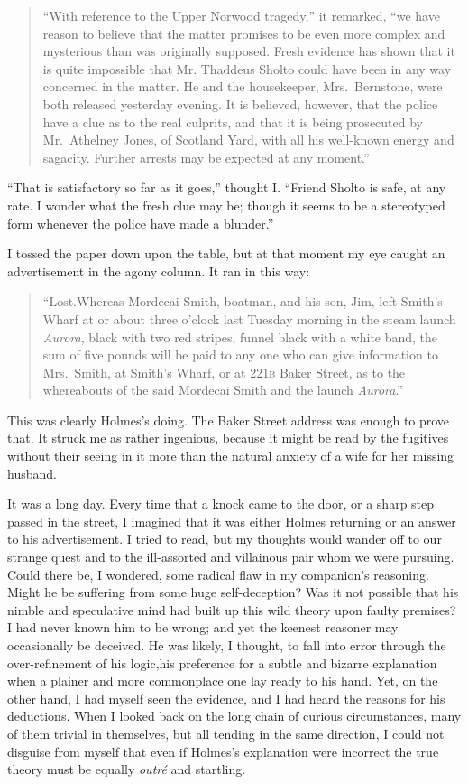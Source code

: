 \documentclass[12pt,english,oneside]{book}
\newcommand{\noun}[1]{\textsc{#1}}
\begin{document}
\begin{quote} {}``With reference to the Upper Norwood tragedy,''
it remarked, {}``we have reason to believe that the matter promises
to be even more complex and mysterious than was originally supposed.
Fresh evidence has shown that it is quite impossible that Mr. Thaddeus
Sholto could have been in any way concerned in the matter. He and
the housekeeper, Mrs.\ Bernstone, were both released yesterday evening.
It is believed, however, that the police have a clue as to the real
culprits, and that it is being prosecuted by Mr.\ Athelney Jones,
of Scotland Yard, with all his well-known energy and sagacity. Further
arrests may be expected at any moment.''\end{quote}

{}``That is satisfactory so far as it goes,'' thought I. {}``Friend
Sholto is safe, at any rate. I wonder what the fresh clue may be;
though it seems to be a stereotyped form whenever the police have
made a blunder.''

I tossed the paper down upon the table, but at that moment my eye
caught an advertisement in the agony column. It ran in this way:

\begin{quote} {}``Lost.\mdsh{---}Whereas Mordecai Smith, boatman,
and his son, Jim, left Smith's Wharf at or about three o'clock last
Tuesday morning in the steam launch \emph{Aurora}, black with two
red stripes, funnel black with a white band, the sum of five pounds
will be paid to any one who can give information to Mrs.\ Smith,
at Smith's Wharf, or at \noun{221b} Baker Street, as to the whereabouts
of the said Mordecai Smith and the launch \emph{Aurora}.''\end{quote}

This was clearly Holmes's doing. The Baker Street address was enough
to prove that. It struck me as rather ingenious, because it might
be read by the fugitives without their seeing in it more than the
natural anxiety of a wife for her missing husband.

It was a long day. Every time that a knock came to the door, or a
sharp step passed in the street, I imagined that it was either Holmes
returning or an answer to his advertisement. I tried to read, but
my thoughts would wander off to our strange quest and to the ill-assorted
and villainous pair whom we were pursuing. Could there be, I wondered,
some radical flaw in my companion's reasoning. Might he be suffering
from some huge self-deception? Was it not possible that his nimble
and speculative mind had built up this wild theory upon faulty premises?
I had never known him to be wrong; and yet the keenest reasoner may
occasionally be deceived. He was likely, I thought, to fall into error
through the over-refinement of his logic,\mdsh{---}his preference
for a subtle and bizarre explanation when a plainer and more commonplace
one lay ready to his hand. Yet, on the other hand, I had myself seen
the evidence, and I had heard the reasons for his deductions. When
I looked back on the long chain of curious circumstances, many of
them trivial in themselves, but all tending in the same direction,
I could not disguise from myself that even if Holmes's explanation
were incorrect the true theory must be equally \emph{outré} and startling.
\end{document}

